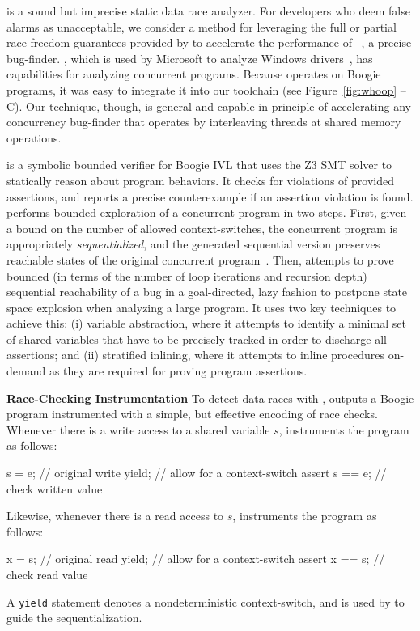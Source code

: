 \whoop is a sound but imprecise static data race analyzer. For developers who deem false alarms as unacceptable, we consider a method for leveraging the full or partial race-freedom guarantees provided by \whoop to accelerate the performance of \corral~\cite{lal2012corral}, a precise bug-finder. \corral, which is used by Microsoft to analyze Windows drivers~\cite{lal2014powering}, has capabilities for analyzing concurrent programs.  Because \corral operates on Boogie programs, it was easy to integrate it into our toolchain (see Figure~\ref{fig:whoop} -- C). Our technique, though, is general and capable in principle of accelerating any concurrency bug-finder that operates by interleaving threads at shared memory operations.

\corral is a symbolic bounded verifier for Boogie IVL that uses the Z3 SMT solver to statically reason about program behaviors. It checks for violations of provided assertions, and reports a precise counterexample if an assertion violation is found. \corral performs bounded exploration of a concurrent program in two steps. First, given a bound on the number of allowed context-switches, the concurrent program is appropriately \emph{sequentialized}, and the generated sequential version preserves reachable states of the original concurrent program~\cite{popl2011-eqr,cav2009-lqr,cavLalR08}. Then, \corral attempts to prove bounded (in terms of the number of loop iterations and recursion depth) sequential reachability of a bug in a goal-directed, lazy fashion to postpone state space explosion when analyzing a large program. It uses two key techniques to achieve this: (i) variable abstraction, where it attempts to identify a minimal set of shared variables that have to be precisely tracked in order to discharge all assertions; and (ii) stratified inlining, where it attempts to inline procedures on-demand as they are required for proving program assertions.

\noindent\textbf{Race-Checking Instrumentation }
%
To detect data races with \corral, \whoop outputs a Boogie program instrumented with a simple, but effective encoding of race checks. Whenever there is a write access to a shared variable $s$, \whoop instruments the program as follows:
%
\begin{boogie}
s = e;         // original write
yield;         // allow for a context-switch
assert s == e; // check written value
\end{boogie}
%
Likewise, whenever there is a read access to $s$, \whoop instruments the program as follows:
%
\begin{boogie}
x = s;         // original read
yield;         // allow for a context-switch
assert x == s; // check read value
\end{boogie}
%
A \texttt{yield} statement denotes a nondeterministic context-switch, and is used by \corral to guide the sequentialization.

